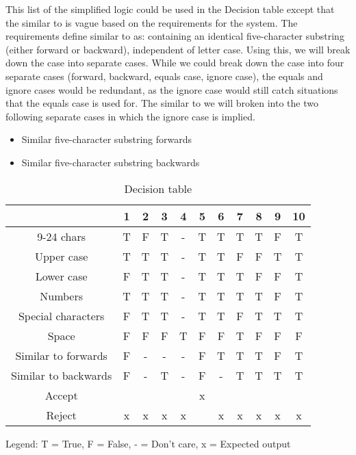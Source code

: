 \documentclass[12pt,letterpaper]{article}
\begin{document}
This list of the simplified logic could be used in the Decision table except that the similar to is vague based on the
requirements for the system. The requirements define similar to as: containing an identical five-character
substring (either forward or backward), independent of letter case.
Using this, we will break down the case into separate cases. While we could break down the case into
four separate cases (forward, backward, equals case, ignore case), the equals and
ignore cases would be redundant, as the ignore case would still catch situations that the equals
case is used for. The similar to we will broken into the two following separate cases in which the ignore case is implied.
\begin{itemize}
\item Similar five-character substring forwards
\item Similar five-character substring backwards
\end{itemize}

\begin{table}[h]
  \begin{center}
    \caption{Decision table}
    \label{tab:Main table}
    
    \begin{tabular}{c|c|c|c|c|c|c|c|c|c|c|}
    & 1 & 2 & 3 & 4 & 5 & 6 & 7 & 8 & 9 & 10 \\
    \hline
    9-24 chars & T & F & T & - & T & T & T & T & F & T \\
    \hline
    Upper case & T & T & T & - & T & T & F & F & T & T \\
    \hline
    Lower case & F & T & T & - & T & T & T & F & F & T \\
    \hline
    Numbers & T & T & T & - & T & T & T & T & F & T \\
    \hline
    Special characters & F & T & T & - & T & T & F & T & T & T \\
    \hline
    Space & F & F & F & T & F & F & T & F & F & F \\
    \hline 
    Similar to forwards & F & - & - & - & F & T & T & T & F & T \\
    \hline
    Similar to backwards & F & - & T & - & F & - & T & T & T & T \\
    \midrule
    Accept & & & & & x & & & & & \\
    \hline
    Reject & x & x & x & x & & x & x & x & x & x \\
    \end{tabular}
    
    Legend: T = True, F = False, - = Don't care, x = Expected output
  \end{center}
\end{table}
\end{document}
